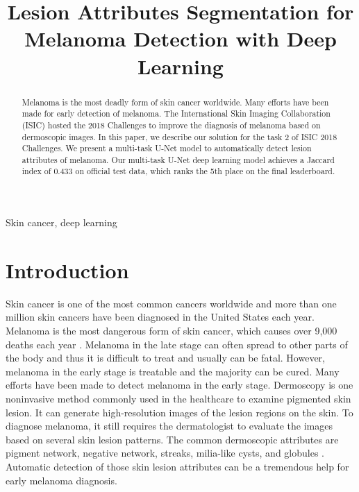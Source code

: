 \documentclass{article}
\title{Lesion Attributes Segmentation for Melanoma Detection with Deep Learning}
\begin{document}
%
\maketitle
%
\begin{abstract}
Melanoma is the most deadly form of skin cancer worldwide. Many efforts have been made for early detection of melanoma. The International Skin Imaging Collaboration (ISIC) hosted the 2018 Challenges to improve the diagnosis of melanoma based on dermoscopic images. In this paper, we describe our solution for the task 2 of ISIC 2018 Challenges. We present a multi-task U-Net model  to automatically detect lesion attributes of melanoma. Our multi-task U-Net deep learning model achieves a Jaccard index of 0.433 on official test data, which ranks the 5th place on the final leaderboard. 
\end{abstract}
%
\begin{keywords}
Skin cancer, deep learning
\end{keywords}
%
\section{Introduction}
\label{sec:intro}

Skin cancer is one of the most common cancers worldwide and more than one million skin cancers have been diagnosed in the United States each year. Melanoma is the most dangerous form of skin cancer, which causes over 9,000 deaths each year \cite{ucsw2013united}. Melanoma in the late stage can often spread to other parts of the body and thus it is difficult to treat and usually can be fatal. However, melanoma in the early stage is treatable and the majority can be cured. Many efforts have been made to detect melanoma in the early stage. Dermoscopy is one noninvasive method commonly used in the healthcare to examine pigmented skin lesion. It can generate high-resolution images of the lesion regions on the skin. To diagnose melanoma, it still requires the dermatologist to evaluate the images based on several skin lesion patterns. The common dermoscopic attributes are pigment network, negative network, streaks, milia-like cysts, and globules \cite{mishra2016overview}. Automatic detection of those skin lesion attributes can be a tremendous help for early melanoma diagnosis. 
\end{document}
